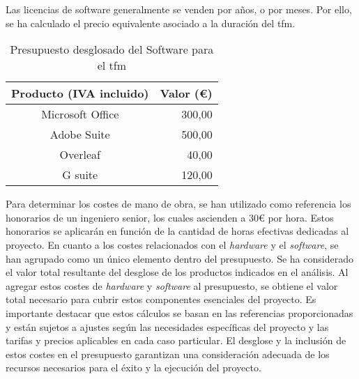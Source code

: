 Las licencias de software generalmente se venden por años, o por meses. Por ello, se ha calculado el precio equivalente asociado a la duración del \gls{tfm}.
\begin{table}[ht]
	\centering
	\begin{tabular}{|c|r|}
		\hline
		\rowcolor[HTML]{EFEFEF}
		\textbf{Producto (IVA incluido)} & \multicolumn{1}{c|}{\cellcolor[HTML]{EFEFEF}\textbf{Valor (€)}} \\ \hline
		Microsoft Office                 & 300,00                                                          \\ \hline
		Adobe Suite                      & 500,00                                                          \\ \hline
		Overleaf                         & 40,00                                                           \\ \hline
		G suite                          & 120,00                                                          \\ \hline
	\end{tabular}
	\caption{Presupuesto desglosado del Software  para el \gls{tfm}}
	\label{tab:costesSoftware}
\end{table}

\vspace{0.5cm}

Para determinar los costes de mano de obra, se han utilizado como referencia los honorarios de un ingeniero senior, los cuales ascienden a 30€ por hora. Estos honorarios se aplicarán en función de la cantidad de horas efectivas dedicadas al proyecto. En cuanto a los costes relacionados con el \textit{hardware} y el \textit{software}, se han agrupado como un único elemento dentro del presupuesto. Se ha considerado el valor total resultante del desglose de los productos indicados en el análisis. Al agregar estos costes de \textit{hardware} y \textit{software} al presupuesto, se obtiene el valor total necesario para cubrir estos componentes esenciales del proyecto. Es importante destacar que estos cálculos se basan en las referencias proporcionadas y están sujetos a ajustes según las necesidades específicas del proyecto y las tarifas y precios aplicables en cada caso particular. El desglose y la inclusión de estos costes en el presupuesto garantizan una consideración adecuada de los recursos necesarios para el éxito y la ejecución del proyecto.
\vspace{0.5cm}

